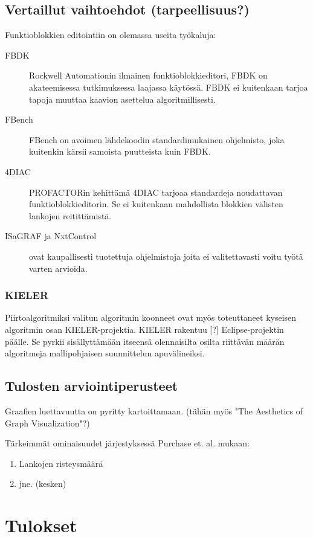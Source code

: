 \documentclass[finnish,12pt]{article}
\begin{document}
		\subsection{Vertaillut vaihtoehdot (tarpeellisuus?) }

Funktioblokkien editointiin on olemassa useita työkaluja:
\begin{description}
	\item[FBDK] Rockwell Automationin ilmainen funktioblokkieditori, FBDK on akateemisessa tutkimuksessa laajassa käytössä. FBDK ei kuitenkaan tarjoa tapoja muuttaa kaavion asettelua algoritmillisesti.
	\item[FBench] FBench on avoimen lähdekoodin standardimukainen ohjelmisto, joka kuitenkin kärsii samoista puutteista kuin FBDK.
	\item[4DIAC] PROFACTORin kehittämä 4DIAC tarjoaa standardeja noudattavan funktioblokkieditorin. Se ei kuitenkaan mahdollista blokkien välisten lankojen reitittämistä. 
	\item[ISaGRAF ja NxtControl] ovat kaupallisesti tuotettuja ohjelmistoja joita ei valitettavasti voitu työtä varten arvioida.
\end{description}

			\subsubsection{KIELER}

Piirtoalgoritmiksi valitun algoritmin koonneet ovat myös toteuttaneet kyseisen algoritmin osan KIELER-projektia.
KIELER rakentuu [?] Eclipse-projektin päälle. Se pyrkii sisällyttämään itseensä olennaisilta osilta riittävän määrän algoritmeja mallipohjaisen suunnittelun apuvälineiksi.

		\subsection{Tulosten arviointiperusteet}

Graafien luettavuutta on pyritty kartoittamaan. \cite{RefWorks:47}
(tähän myös "The Aesthetics of Graph Visualization"?)

Tärkeimmät ominaisuudet järjestyksessä Purchase et. al. mukaan: 
\begin{enumerate}
  \item Lankojen risteysmäärä
  \item jne. (kesken)
\end{enumerate}

	\clearpage
	\section{Tulokset}
	
\end{document}
